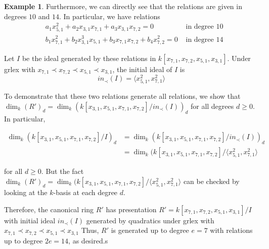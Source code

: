 \documentclass{amsart}
\theoremstyle{plain}
\theoremstyle{definition}
\newtheorem{example}[thm]{Example}
\theoremstyle{remark}
\numberwithin{equation}{section}
\begin{document}
\begin{example}

Furthermore, we can directly see that the relations are given
in degrees $10$ and $14$. In particular, we have relations
\begin{align*}
	&a_1 x_{5, 1}^2 + a_2 x_{3, 1} x_{7, 1} + a_3 x_{3, 1} x_{7, 2} = 0 &\text{ in degree $10$} \\
	&b_1 x_{7, 1}^2 + b_2 x_{3, 1}^3 x_{5, 1} + b_3 x_{7, 1} x_{7, 2} + b_4 x_{7, 2}^2 = 0  &\text{ in degree $14$}
\end{align*}


Let $I$ be the ideal generated by these relations in
$k[x_{7, 1}, x_{7, 2}, x_{5, 1}, x_{3, 1}]$. Under grlex with
$x_{7,1} \prec x_{7,2} \prec x_{5,1} \prec x_{3,1}$, the initial ideal of $I$ is 
\[
	in_\prec(I) = \langle x_{5, 1}^2, x_{7, 1}^2 \rangle
\]

To demonstrate that these two relations generate all 
relations, we show that $\dim_k (R')_d = \dim_k
(k[x_{3, 1}, x_{5, 1}, x_{7, 1}, x_{7, 2}] / in_\prec(I))_d$ for all degrees
$d \geq 0$. In particular, 

\begin{align*}
	\dim_k (k[x_{3, 1}, x_{5, 1}, x_{7, 1}, x_{7, 2}] / I)_d &=
	\dim_k (k[x_{3, 1}, x_{5, 1}, x_{7, 1}, x_{7, 2}]	/ in_\prec(I))_d \\
	&= \dim_k (k[x_{3, 1}, x_{5, 1}, x_{7, 1}, x_{7, 2}] / \langle x_{5, 1}^2,
	x_{7, 1}^2 \rangle
\end{align*}

\noindent
for all $d \geq 0$. But the fact $\dim_k (R')_d = \dim_k (k[x_{3, 1},
x_{5, 1}, x_{7, 1}, x_{7, 2}] / \langle x_{5, 1}^2,	x_{7, 1}^2 \rangle$ can
be checked by looking at the $k$-basis at each degree $d$.

Therefore, the canonical ring $R'$ has presentation $R' =
k[x_{7, 1}, x_{7, 2}, x_{5, 1}, x_{3, 1}] / I$ with
initial ideal $in_\prec(I)$ generated by quadratics under grlex
with $x_{7,1} \prec x_{7,2} \prec x_{5,1} \prec x_{3,1}$
Thus, $R'$ is generated up to
degree $e = 7$ with relations up to degree $2e = 14$, as desired.s


\end{example}
\end{document}
